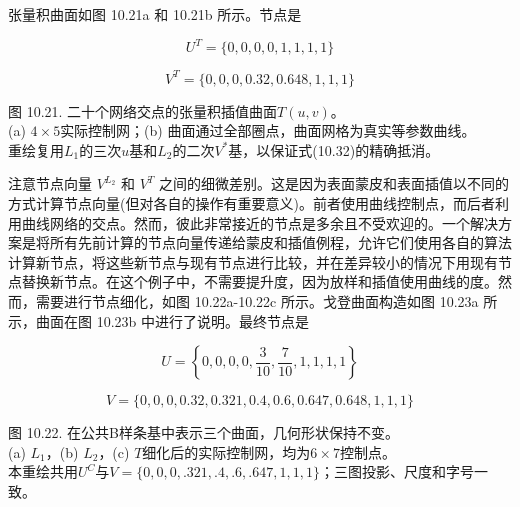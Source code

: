 \documentclass[../main.tex]{subfiles}
\begin{document}
张量积曲面如图 10.21a 和 10.21b 所示。节点是

\[
{U}^{T} = \{ 0,0,0,0,1,1,1,1\}
\]

\[
{V}^{T} = \{ 0,0,0,{0.32},{0.648},1,1,1\}
\]

\begin{center}
\begin{minipage}{37cm}
\vspace*{.6\baselineskip}
\centering
{}
\par\smallskip
图 10.21. 二十个网络交点的张量积插值曲面$T(u,v)$。\\
(a) $4\times5$实际控制网；(b) 曲面通过全部圈点，曲面网格为真实等参数曲线。\\
重绘复用$L_1$的三次$u$基和$L_2$的二次$V^*$基，以保证式(10.32)的精确抵消。
\end{minipage}
\end{center}

注意节点向量 \({V}^{{L}_{2}}\) 和 \({V}^{T}\) 之间的细微差别。这是因为表面蒙皮和表面插值以不同的方式计算节点向量(但对各自的操作有重要意义)。前者使用曲线控制点，而后者利用曲线网络的交点。然而，彼此非常接近的节点是多余且不受欢迎的。一个解决方案是将所有先前计算的节点向量传递给蒙皮和插值例程，允许它们使用各自的算法计算新节点，将这些新节点与现有节点进行比较，并在差异较小的情况下用现有节点替换新节点。在这个例子中，不需要提升度，因为放样和插值使用曲线的度。然而，需要进行节点细化，如图 10.22a-10.22c 所示。戈登曲面构造如图 10.23a 所示，曲面在图 10.23b 中进行了说明。最终节点是

\[
U = \left\{  {0,0,0,0,\frac{3}{10},\frac{7}{10},1,1,1,1}\right\}
\]

\[
V = \{ 0,0,0,{0.32},{0.321},{0.4},{0.6},{0.647},{0.648},1,1,1\}
\]

\begin{center}
\begin{minipage}{37cm}
\vspace*{.6\baselineskip}
\centering
{}\par\vspace{.5cm}
\par\smallskip
图 10.22. 在公共B样条基中表示三个曲面，几何形状保持不变。\\
(a) $L_1$，(b) $L_2$，(c) $T$细化后的实际控制网，均为$6\times7$控制点。\\
本重绘共用$U^C$与$V=\{0,0,0,.321,.4,.6,.647,1,1,1\}$；三图投影、尺度和字号一致。
\end{minipage}
\end{center}
\end{document}
